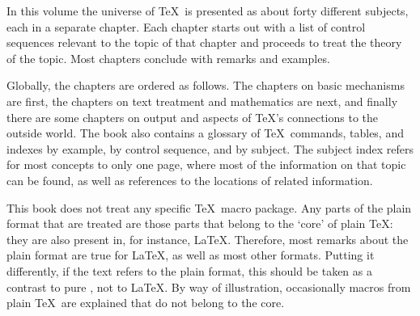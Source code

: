\documentclass[letterpaper]{book}
\begin{document}
In this volume the universe of \TeX\ is presented as
about forty different subjects, each in a separate
chapter.
Each chapter starts out with a list of control sequences
relevant to the topic of that chapter
and proceeds to treat the 
theory of the topic. 
Most chapters conclude with remarks and examples.

Globally, the chapters are ordered as follows. 
The chapters on basic mechanisms are first,
the chapters on text treatment and mathematics are next,
and finally there are some
chapters on output and aspects of \TeX's connections to
the outside world.
%
The book also contains a glossary of \TeX\
commands, tables,
and indexes by example, by control sequence, and by subject.
The subject index refers for most concepts to
only one page, where most of the information
on that topic can be found, as well as references
to the locations of related information.

This book does not treat any specific \TeX\ macro package.
Any parts of the plain format that are treated are those
parts that belong to the `core' of plain \TeX: they
are also present in, for instance, \LaTeX.
Therefore, most remarks about the plain format
are true for \LaTeX, as well as most other formats.
Putting it differently,
if the text refers to the plain format, this should be taken
as a contrast to pure \IniTeX, not to \LaTeX.
By way of illustration, occasionally macros from plain \TeX\
are explained that do not belong to the core.
\end{document}
